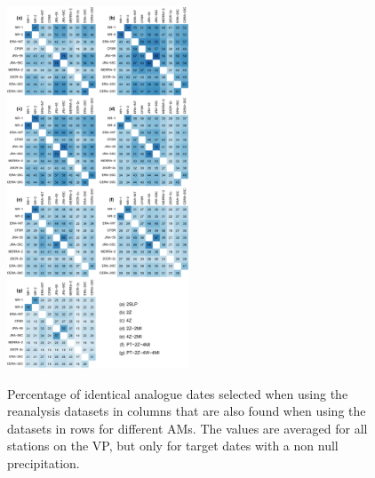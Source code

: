 \documentclass[twocolumn]{svjour3}       %
\begin{document}
	\begin{figure}
		\includegraphics[width=0.48\textwidth]{figure-supp-dates-thres-0.pdf}\\
		\caption{Percentage of identical analogue dates selected when using the reanalysis datasets in columns that are also found when using the datasets in rows for different AMs. The values are averaged for all stations on the VP, but only for target dates with a non null precipitation.}
		\label{fig:similarities_analogue_dates_0}
	\end{figure}
	
\end{document}

